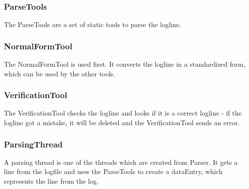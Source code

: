 \subsubsection*{ParseTools}
The ParseTools are a set of static tools to parse the logline.

\subsubsection*{NormalFormTool}
The NormalFormTool is used first. It converts the logline in a standardized form, which can be used by the other tools.

\subsubsection*{VerificationTool}
The VerificationTool checks the logline and looks if it is a correct logline - if the logline got a mistake, it will 
be deleted and the VerificationTool sends an error.



\subsubsection*{ParsingThread}
A parsing thread is one of the threads which are created from Parser. It gets a line from the logfile and uses the ParseTools
to create a dataEntry, which represents the line from the log. 

